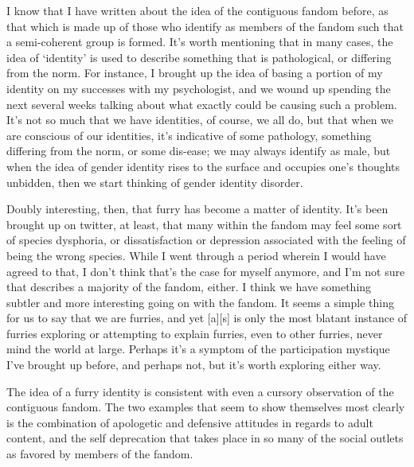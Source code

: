 I know that I have written about the idea of the contiguous fandom before, as that which is made up of those who identify as members of the fandom such that a semi-coherent group is formed.  It's worth mentioning that in many cases, the idea of `identity' is used to describe something that is pathological, or differing from the norm.  For instance, I brought up the idea of basing a portion of my identity on my successes with my psychologist, and we wound up spending the next several weeks talking about what exactly could be causing such a problem.  It's not so much that we have identities, of course, we all do, but that when we are conscious of our identities, it's indicative of some pathology, something differing from the norm, or some dis-ease; we may always identify as male, but when the idea of gender identity rises to the surface and occupies one's thoughts unbidden, then we start thinking of gender identity disorder.

Doubly interesting, then, that furry has become a matter of identity.  It's been brought up on twitter, at least, that many within the fandom may feel some sort of species dysphoria, or dissatisfaction or depression associated with the feeling of being the wrong species.  While I went through a period wherein I would have agreed to that, I don't think that's the case for myself anymore, and I'm not sure that describes a majority of the fandom, either.  I think we have something subtler and more interesting going on with the fandom.  It seems a simple thing for us to say that we are furries, and yet [a][s] is only the most blatant instance of furries exploring or attempting to explain furries, even to other furries, never mind the world at large.  Perhaps it's a symptom of the participation mystique I've brought up before, and perhaps not, but it's worth exploring either way.

The idea of a furry identity is consistent with even a cursory observation of the contiguous fandom.  The two examples that seem to show themselves most clearly is the combination of apologetic and defensive attitudes in regards to adult content, and the self deprecation that takes place in so many of the social outlets as favored by members of the fandom.

